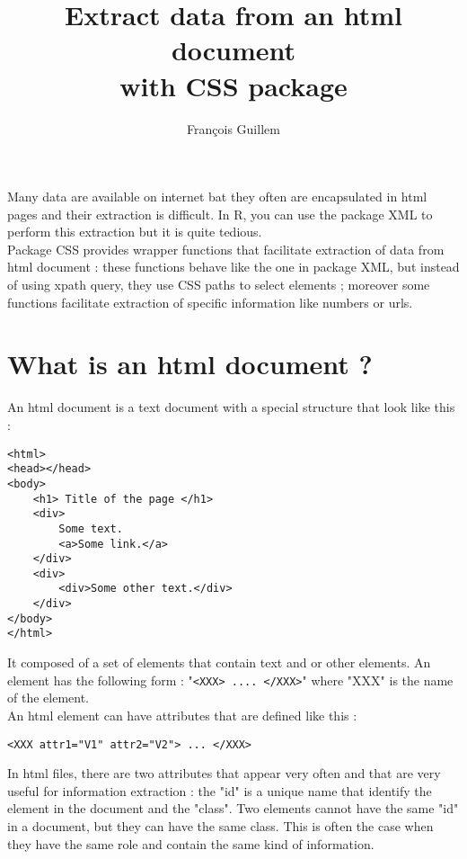 \documentclass{article}
\begin{document}


\title{Extract data from an html document\\with CSS package}
\author{François Guillem}
\maketitle

Many data are available on internet bat they often are encapsulated in html pages 
and their extraction is difficult. In R, you can use the package XML to perform this extraction but it is quite tedious.\\

Package CSS provides wrapper functions that facilitate extraction of data from html document : these functions behave like the one in package XML, but instead of using xpath query, they use CSS paths to select elements ; moreover some functions facilitate extraction of specific information like numbers or urls.

\section*{What is an html document ?}
An html document is a text document with a special structure that look like this :

\begin{verbatim}
<html>
<head></head>
<body>
    <h1> Title of the page </h1>
    <div>
        Some text.
        <a>Some link.</a>
    </div>
    <div>  
        <div>Some other text.</div>
    </div>
</body>
</html>
\end{verbatim}

It composed of a set of elements that contain text and or other elements. An element has the following form : "\texttt{<XXX> .... </XXX>}" where "XXX" is the name of the element.\\

An html element can have attributes that are defined like this :
\begin{verbatim}
<XXX attr1="V1" attr2="V2"> ... </XXX>
\end{verbatim}

In html files, there are two attributes that appear very often and that are very useful for information extraction : the "id" is a unique name that identify the element in the document and the "class". Two elements cannot have the same "id" in a document, but they can have the same class. This is often the case when they have the same role and contain the same kind of information.
\end{document}
